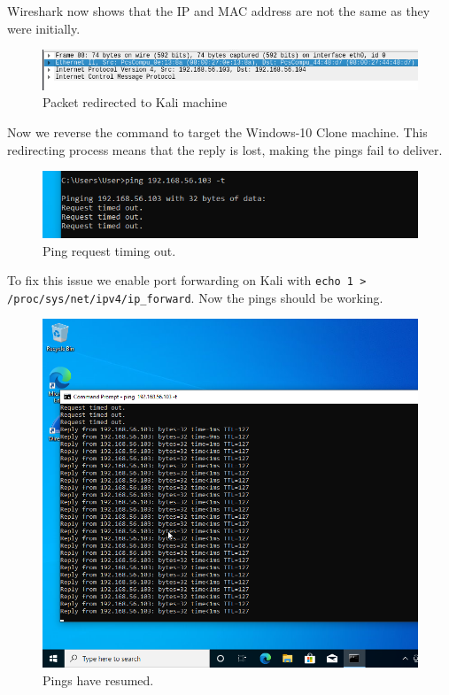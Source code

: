 Wireshark now shows that the IP and MAC address are not the same as they were initially.
\begin{figure}[H]
    \centering
    \includegraphics[width=\linewidth]{figures/wireshark-arp-1.png}
    \caption{Packet redirected to Kali machine}
    \label{fig:wireshark-redirect}
\end{figure}

Now we reverse the command to target the Windows-10 Clone machine.
This redirecting process means that the reply is lost, making the pings fail to deliver.
\begin{figure}[H]
    \centering
    \includegraphics[width=\linewidth]{figures/ping-broken.png}
    \caption{Ping request timing out.}
    \label{fig:ping-fail}
\end{figure}

To fix this issue we enable port forwarding on Kali with \verb|echo 1 > /proc/sys/net/ipv4/ip_forward|.
Now the pings should be working.
\begin{figure}[H]
    \centering
    \includegraphics[width=\linewidth]{figures/ping-working-again.png}
    \caption{Pings have resumed.}
    \label{fig:ping-better}
\end{figure}

